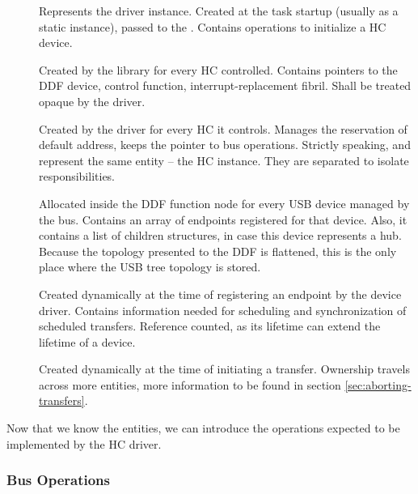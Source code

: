 \begin{description}
	\item[]
		Represents the driver instance. Created at the task startup (usually as
		a static instance), passed to the . Contains
		operations to initialize a HC device.
	\item[]
		Created by the library for every HC controlled. Contains pointers to
		the DDF device, control function, interrupt-replacement fibril. Shall
		be treated opaque by the driver.
	\item[]
		Created by the driver for every HC it controls. Manages the reservation
		of default address, keeps the pointer to bus operations. Strictly
		speaking,  and  represent the same
		entity -- the HC instance. They are separated to isolate responsibilities.
	\item[]
		Allocated inside the DDF function node for every USB device managed by
		the bus. Contains an array of endpoints registered for that device.
		Also, it contains a list of children  structures, in
		case this device represents a hub. Because the topology presented to
		the DDF is flattened, this is the only place where the USB tree
		topology is stored.
	\item[]
		Created dynamically at the time of registering an endpoint by the
		device driver. Contains information needed for scheduling and
		synchronization of scheduled transfers. Reference counted, as its
		lifetime can extend the lifetime of a device.
	\item[]
		Created dynamically at the time of initiating a transfer. Ownership
		travels across more entities, more information to be found in section
		\ref{sec:aborting-transfers}.
\end{description}

Now that we know the entities, we can introduce the operations expected to be
implemented by the HC driver.

\subsubsection{Bus Operations}

